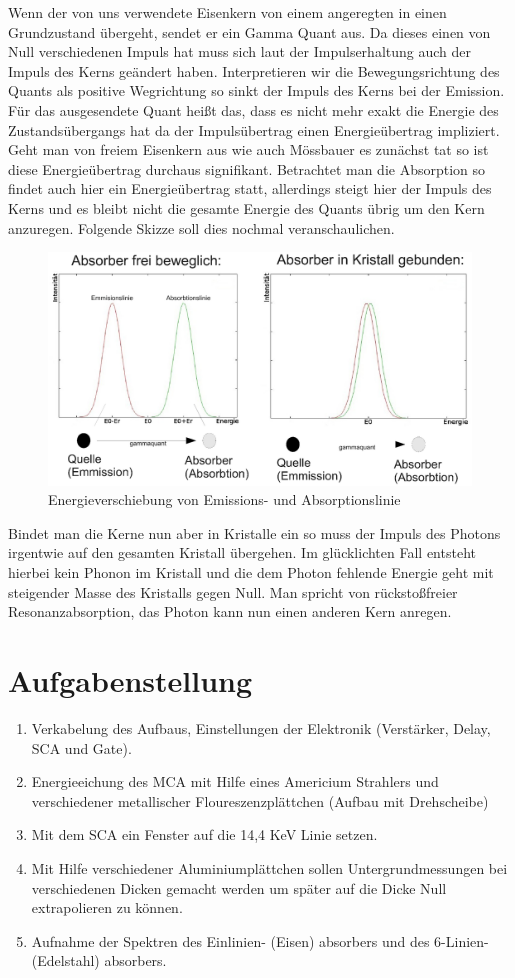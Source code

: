 \documentclass[12pt]{article}
\begin{document}
Wenn der von uns verwendete Eisenkern von einem angeregten in einen Grundzustand übergeht, sendet er ein Gamma Quant aus. Da dieses einen von Null verschiedenen 
Impuls hat muss sich laut der Impulserhaltung auch der Impuls des Kerns geändert haben. Interpretieren wir die Bewegungsrichtung des Quants als positive
Wegrichtung so sinkt der Impuls des Kerns bei der Emission. Für das ausgesendete Quant heißt das, dass es nicht mehr exakt die Energie des Zustandsübergangs
hat da der Impulsübertrag einen Energieübertrag impliziert. Geht man von freiem Eisenkern aus wie auch Mössbauer es zunächst tat so ist diese Energieübertrag
durchaus signifikant. Betrachtet man die Absorption so findet auch hier ein Energieübertrag statt, allerdings steigt hier der Impuls des Kerns und es bleibt
nicht die gesamte Energie des Quants übrig um den Kern anzuregen. Folgende Skizze soll dies nochmal veranschaulichen.
\begin{figure}
 \includegraphics[width=0.9\linewidth]{pictures/linienskizze.ps}
 \caption{Energieverschiebung von Emissions- und Absorptionslinie}
 \label{linienskizze}
\end{figure}


Bindet man die Kerne nun aber in Kristalle ein so muss der Impuls des Photons irgentwie auf den gesamten Kristall übergehen. Im glücklichten Fall entsteht
hierbei kein Phonon im Kristall und die dem Photon fehlende Energie geht mit steigender Masse des Kristalls gegen Null. Man spricht von rückstoßfreier
Resonanzabsorption, das Photon kann nun einen anderen Kern anregen.
\section{Aufgabenstellung}
\begin{enumerate}
 \item Verkabelung des Aufbaus, Einstellungen der Elektronik (Verstärker, Delay, SCA und Gate).
 \item Energieeichung des MCA mit Hilfe eines Americium Strahlers und verschiedener metallischer Floureszenzplättchen (Aufbau mit Drehscheibe)
 \item Mit dem SCA ein Fenster auf die 14,4 KeV Linie setzen.
 \item Mit Hilfe verschiedener Aluminiumplättchen sollen Untergrundmessungen bei verschiedenen Dicken gemacht werden um später auf die Dicke Null extrapolieren zu können.
 \item Aufnahme der Spektren des Einlinien- (Eisen) absorbers und des 6-Linien- (Edelstahl) absorbers.
\end{enumerate}
\end{document}
